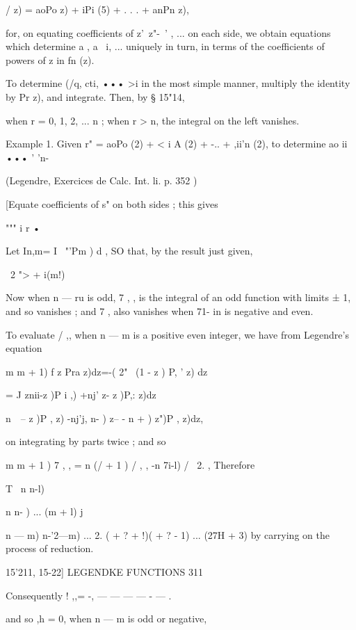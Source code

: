 {/   z) = aoPo  z) +  iPi (5) + . . . + anPn  z), 

for, on equating coefficients of z'\ z"-~' , ... on each side, we obtain equations 
which determine a , a \ i, ... uniquely in turn, in terms of the coefficients of 
powers of z in fn (z). 

To determine (/q, cti, •••  >i in the most simple manner, multiply the 
identity by Pr z), and integrate. Then, by § 15"14, 

when r = 0, 1, 2, ... n ; when r > n, the integral on the left vanishes. 

Example 1. Given r" = aoPo (2) + < i A (2) + -.. +  ,ii'n (2), to determine ao   ii ••• ' 'n- 

(Legendre, Exercices de Calc. Int. li. p. 352 ) 

[Equate coefficients of s" on both sides ; this gives 

""" i r • 

Let In,m= I ~"'Pm   ) d , SO that, by the result just given, 

\ 2 "> + i(m!)  

Now when n — ru is odd, 7 ,  , is the integral of an odd function with limits ± 1, and so 
vanishes ; and 7  ,  also vanishes when 71- in is negative and even. 

To evaluate / ,,  when n — m is a positive even integer, we have from Legendre's 
equation 

m  m + 1) f   z Pra z)dz=-(   2"  \   (1 - z ) P, '  z)  dz 

= J znii-z )P i ,) +nj' z-   z )P,: z)dz 

  n\ \  --   z )P , z)  -nj'j, n- ) z-- - n +  ) z")P , z)dz, 

on integrating by parts twice ; and so 

m  m + 1 ) 7 , ,  = n (/  + 1 ) / , ,  -n 7i-l) /  \  2.  ,   
Therefore 



T \  n n-l) 



n n- )  ... (m + l) j 



 n — m) n-'2—m) ... 2. (  + ?  + !)(  + ? - 1) ... (27H + 3) 
by carrying on the process of reduction. 



15'211, 15-22] LEGENDKE FUNCTIONS 311 

Consequently ! ,,= -, — — — — - — . 

and so  ,h = 0, when n — m is odd or negative, 

}
